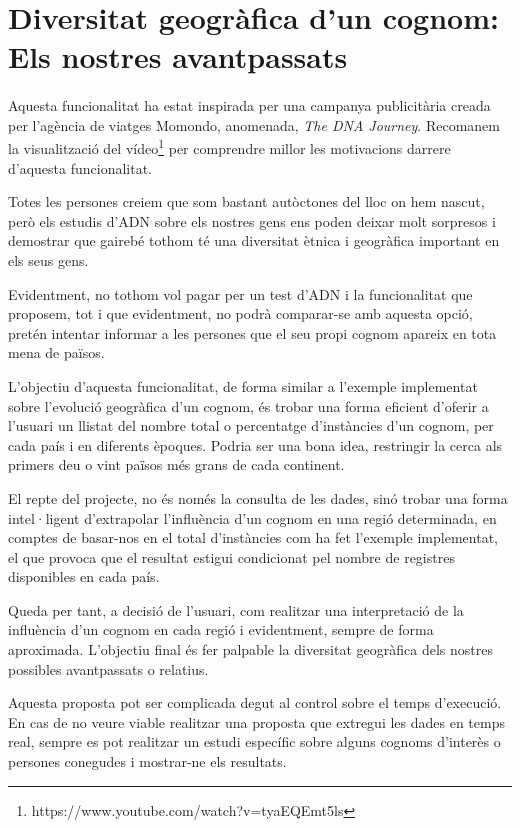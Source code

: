 \section{Diversitat geogràfica d'un cognom: Els nostres avantpassats}

    \paragraph{}
    Aquesta funcionalitat ha estat inspirada per una campanya publicitària creada per l'agència de viatges Momondo, anomenada, \emph{The DNA Journey}. Recomanem la visualització del vídeo\footnote{https://www.youtube.com/watch?v=tyaEQEmt5ls} per comprendre millor les motivacions darrere d'aquesta funcionalitat.

    Totes les persones creiem que som bastant autòctones del lloc on hem nascut, però els estudis d'ADN sobre els nostres gens ens poden deixar molt sorpresos i demostrar que gairebé tothom té una diversitat ètnica i geogràfica important en els seus gens.

    Evidentment, no tothom vol pagar per un test d'ADN i la funcionalitat que proposem, tot i que evidentment, no podrà comparar-se amb aquesta opció, pretén intentar informar a les persones que el seu propi cognom apareix en tota mena de països.

    L'objectiu d'aquesta funcionalitat, de forma similar a l'exemple implementat sobre l'evolució geogràfica d'un cognom, és trobar una forma eficient d'oferir a l'usuari un llistat del nombre total o percentatge d'instàncies d'un cognom, per cada país i en diferents èpoques. Podria ser una bona idea, restringir la cerca als primers deu o vint països més grans de cada continent.

    El repte del projecte, no és només la consulta de les dades, sinó trobar una forma intel·ligent d'extrapolar l'influència d'un cognom en una regió determinada, en comptes de basar-nos en el total d'instàncies com ha fet l'exemple implementat, el que provoca que el resultat estigui condicionat pel nombre de registres disponibles en cada país.

    Queda per tant, a decisió de l'usuari, com realitzar una interpretació de la influència d'un cognom en cada regió i evidentment, sempre de forma aproximada. L'objectiu final és fer palpable la diversitat geogràfica dels nostres possibles avantpassats o relatius.

    Aquesta proposta pot ser complicada degut al control sobre el temps d'execució. En cas de no veure viable realitzar una proposta que extregui les dades en temps real, sempre es pot realitzar un estudi específic sobre alguns cognoms d'interès o persones conegudes i mostrar-ne els resultats.
